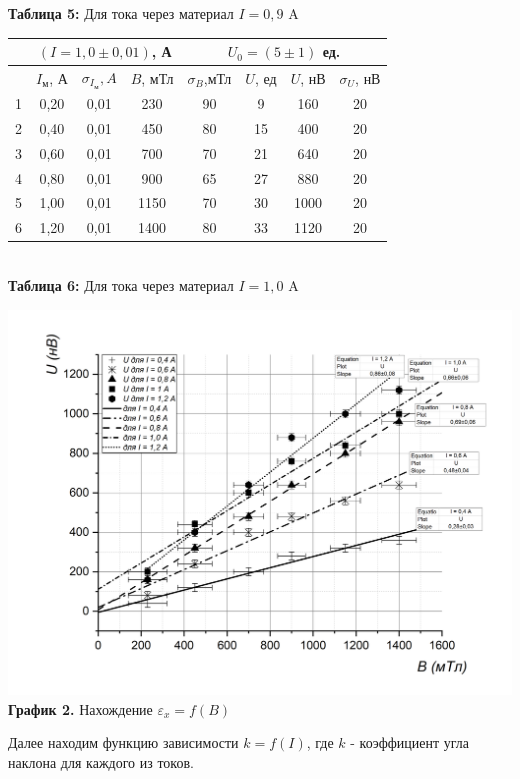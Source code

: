 \documentclass[a4paper, 12pt]{article}%
\begin{document}
\begin{center}
\textbf{Таблица 5:} Для тока через материал $I = 0,9$ A\\
\begin{tabular}{|c|c|c|c|c|c|c|c|}
\hline
 & \multicolumn{3}{c|}{$(I = 1,0 \pm 0,01)$, А} & \multicolumn{4}{c|}{$U_0 = (5 \pm 1)$ ед.} \\ \hline
 & $I_{\text{м}}$, А & $\sigma_{I_{\text{м}}}, A$ & $B$, мТл & $\sigma_B$,мТл & $U$, ед & $U$, нВ & $\sigma_{U}$, нВ \\ \hline
1 & 0,20 & 0,01 & 230 & 90 & 9 & 160 & 20 \\ \hline
2 & 0,40 & 0,01 & 450 & 80 & 15 & 400 & 20 \\ \hline
3 & 0,60 & 0,01 & 700 & 70 & 21 & 640 & 20 \\ \hline
4 & 0,80 & 0,01 & 900 & 65 & 27 & 880 & 20 \\ \hline
5 & 1,00 & 0,01 & 1150 & 70 & 30 & 1000 & 20 \\ \hline
6 & 1,20 & 0,01 & 1400 & 80 & 33 & 1120 & 20 \\ \hline
\end{tabular}\\
\textbf{Таблица 6:} Для тока через материал $I = 1,0$ A\\
\end{center}
\begin{center}
\includegraphics[width = \textwidth]{2.jpg}
\textbf{График 2.} Нахождение $\varepsilon_x = f(B)$
\end{center}
Далее находим функцию зависимости $k = f(I)$, где $k$ - коэффициент угла наклона для каждого из токов.\\
\end{document}
